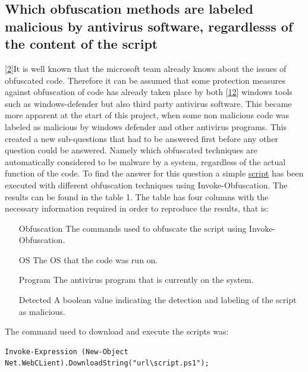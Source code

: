 \documentclass{article}%
\begin{document}
\subsection{Which obfuscation methods are labeled malicious by antivirus software, regardlesss of the content of the script}
[\hyperlink{2}{2}]It is well known that the microsoft team already knows about the issues of obfuscated code. Therefore it can be assumed that some protection measures against obfuscation of code has already taken place by both [\hyperlink{12}{12}] windows tools such as windows-defender but also third party antivirus software. This became more apparent at the start of this project, when some non malicious code was labeled as malicious by windows defender and other antivirus programs. This created a new sub-questions that had to be answered first before any other question could be answered. Namely which obfuscated techniques are automatically considered to be malware by a system, regardless of the actual function of the code. To find the answer for this question a simple \hyperlink{script1}{script} has been executed with different obfuscation techniques using Invoke-Obfuscation. The results can be found in the table 1. The table has four columns with the necessary information required in order to reproduce the results, that is:
\begin{enumerate}
	\item[Obfuscation] The commands used to obfuscate the script using Invoke-Obfuscation.
	\item[OS] The OS that the code was run on.
	\item[Program] The antivirus program that is currently on the system.
	\item[Detected] A boolean value indicating the detection and labeling of the script as malicious.
\end{enumerate}
The command used to download and execute the scripts was:
\begin{verbatim}
Invoke-Expression (New-Object Net.WebCLient).DownloadString("url\script.ps1");
\end{verbatim}
\end{document}
